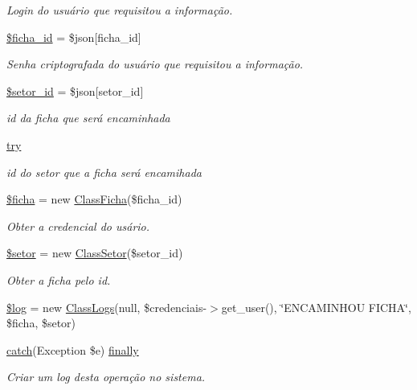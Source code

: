\begin{DoxyCompactItemize}
\begin{DoxyCompactList}\small\item\em Login do usuário que requisitou a informação. \end{DoxyCompactList}\item 
\hyperlink{encaminhar_8php_a6224af2851adb741887322ddb4c77102}{\$ficha\+\_\+id} = \$json\mbox{[}\textquotesingle{}ficha\+\_\+id\textquotesingle{}\mbox{]}
\begin{DoxyCompactList}\small\item\em Senha criptografada do usuário que requisitou a informação. \end{DoxyCompactList}\item 
\hyperlink{encaminhar_8php_a5b0c7406f0030f61ffba63a25ac8a28e}{\$setor\+\_\+id} = \$json\mbox{[}\textquotesingle{}setor\+\_\+id\textquotesingle{}\mbox{]}
\begin{DoxyCompactList}\small\item\em id da ficha que será encaminhada \end{DoxyCompactList}\item 
\hyperlink{encaminhar_8php_abe4cc9788f52e49485473dc699537388}{try}
\begin{DoxyCompactList}\small\item\em id do setor que a ficha será encamihada \end{DoxyCompactList}\item 
\hyperlink{encaminhar_8php_aab83e7ad10d8c95fdbf231d086b83a1f}{\$ficha} = new \hyperlink{class_class_ficha}{Class\+Ficha}(\$ficha\+\_\+id)
\begin{DoxyCompactList}\small\item\em Obter a credencial do usário. \end{DoxyCompactList}\item 
\hyperlink{encaminhar_8php_a87435a25b7cae617cf284c729b6e835c}{\$setor} = new \hyperlink{class_class_setor}{Class\+Setor}(\$setor\+\_\+id)
\begin{DoxyCompactList}\small\item\em Obter a ficha pelo id. \end{DoxyCompactList}\item 
\hyperlink{encaminhar_8php_a9a2cf15a653aee8be437f7ae474cd494}{\$log} = new \hyperlink{class_class_logs}{Class\+Logs}(null, \$credenciais-\/$>$get\+\_\+user(), \char`\"{}E\+N\+C\+A\+M\+I\+N\+H\+OU F\+I\+C\+HA\char`\"{}, \$ficha, \$setor)
\item 
\hyperlink{imprimir_2ficha_2index_8php_a8104793004944f01dd070fc8b1ade3c4}{catch}(Exception \$e) \hyperlink{encaminhar_8php_a1eb47d68a4a4f73debf91b15e179d813}{finally}
\begin{DoxyCompactList}\small\item\em Criar um log desta operação no sistema. \end{DoxyCompactList}\end{DoxyCompactItemize}


